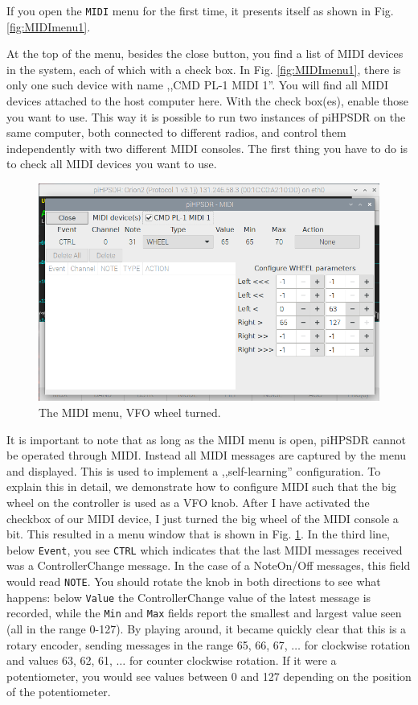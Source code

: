 \documentclass[12pt]{book}
\def\rett#1{\texttt{\color{red}#1}}
\def\bltt#1{\texttt{\color{blue}#1}}
\begin{document}
If you open the \bltt{MIDI} menu for the first time, it presents itself as shown
in Fig. \ref{fig:MIDImenu1}.



At the top of the menu, besides the close button, you find a list of MIDI devices
in the system, each of which with a check box. In Fig. \ref{fig:MIDImenu1}, there is only
one such device with name ,,CMD PL-1 MIDI 1''. You will find all MIDI devices attached
to the host computer here. With the check box(es), enable those you want to use.
This way it is possible to run two instances of piHPSDR on the same computer, both
connected to different radios, and control them independently with two different MIDI
consoles. The first thing you have to do is to check all MIDI devices you want to use.

\begin{figure}[ht]
\center
\includegraphics[width=12cm]{MIDImenu2.png}
\caption{The MIDI menu, VFO wheel turned.}
\label{fig:MIDImenu2}
\end{figure}

It is important to note that as long as the MIDI menu is open, piHPSDR cannot be
operated through MIDI. Instead all MIDI messages are captured by the menu and
displayed. This is used to implement a ,,self-learning'' configuration. To explain
this in detail, we demonstrate how to configure MIDI such that the big wheel on the
controller is used as a VFO knob. After I have activated the checkbox of our
MIDI device, I just turned the big wheel of the MIDI console a bit. This resulted
in a menu window that is shown in Fig. \ref{fig:MIDImenu2}. In the third line,
below \rett{Event}, you see \texttt{CTRL} which indicates that the last MIDI messages
received was a ControllerChange message. In the case of a NoteOn/Off messages, this
field would read \texttt{NOTE}. You should rotate the knob in both directions to
see what happens: below \rett{Value} the ControllerChange value of the latest
message is recorded, while the \rett{Min} and \rett{Max} fields report the smallest
and largest value seen (all in the range 0-127). By playing around, it became
quickly clear that this is a rotary encoder, sending messages in the range 65, 66, 67,
$\ldots$ for clockwise rotation and values 63, 62, 61, $\ldots$ for counter clockwise
rotation. If it were a potentiometer, you would see values between 0 and 127
depending on the position of the potentiometer.
\end{document}
